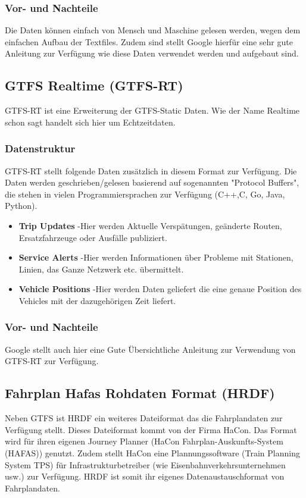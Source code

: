 \documentclass[a4paper,12pt]{scrartcl}
\begin{document}
\subsubsection{Vor- und Nachteile}
\label{sec:gtfs-vornachteile}
Die Daten können einfach von Mensch und Maschine gelesen werden, wegen dem einfachen Aufbau der Textfiles. Zudem sind stellt Google hierfür eine sehr gute Anleitung zur Verfügung wie diese Daten verwendet werden und aufgebaut sind.

\subsection{GTFS Realtime (GTFS-RT)}
\label{sec:gtfs-rt}
GTFS-RT ist eine Erweiterung der GTFS-Static Daten. Wie der Name Realtime schon sagt handelt sich hier um Echtzeitdaten. 
\subsubsection{Datenstruktur}
\label{sec:gtfs-rt-datenstruktur}
GTFS-RT stellt folgende Daten zusätzlich in diesem Format zur Verfügung. Die Daten werden geschrieben/gelesen basierend auf sogenannten "Protocol Buffers", die stehen in vielen Programmiersprachen zur Verfügung (C++,C, Go, Java, Python).
\begin{itemize}
	\item{\textbf{Trip Updates}} -Hier werden Aktuelle Verspätungen, geänderte Routen, Ersatzfahrzeuge oder Ausfälle publiziert.  
	\item{\textbf{Service Alerts}} -Hier werden Informationen über Probleme mit Stationen,  Linien, das Ganze Netzwerk etc. übermittelt. 
	\item{\textbf{Vehicle Positions}} -Hier werden Daten geliefert die eine genaue Position des Vehicles mit der dazugehörigen Zeit liefert. 
\end{itemize}
\subsubsection{Vor- und Nachteile}
\label{sec:gtfs-rt-vornachteile}
Google stellt auch hier eine Gute Übersichtliche Anleitung zur Verwendung von GTFS-RT zur Verfügung.

\subsection{Fahrplan Hafas Rohdaten Format (HRDF)}
\label{subsec:hrdf}
Neben GTFS ist HRDF ein weiteres Dateiformat das die Fahrplandaten zur Verfügung stellt. 
Dieses Dateiformat kommt von der Firma HaCon. Das Format wird für ihren eigenen Journey Planner (HaCon Fahrplan-Auskunfts-System (HAFAS)) genutzt. Zudem stellt HaCon eine Plannungssoftware (Train Planning System TPS) für Infrastrukturbetreiber (wie Eisenbahnverkehrsunternehmen usw.) zur Verfügung. HRDF ist somit ihr eigenes Datenaustauschformat von Fahrplandaten.
\end{document}
